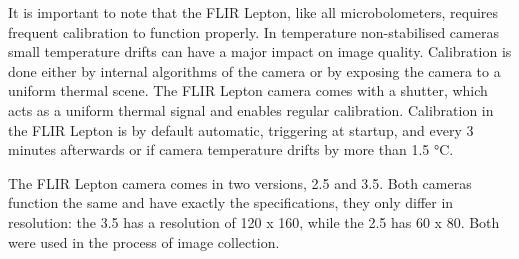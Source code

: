 It is important to note that the FLIR Lepton, like all microbolometers, requires frequent calibration to function properly.
In temperature non-stabilised cameras small temperature drifts can have a major impact on image quality\cite{thermal_book}.
Calibration is done either by internal algorithms of the camera or by exposing the camera to a uniform thermal scene.
The FLIR Lepton camera comes with a shutter, which acts as a uniform thermal signal and enables regular calibration.
Calibration in the FLIR Lepton is by default automatic, triggering at startup, and every 3 minutes afterwards or if camera temperature drifts by more than 1.5 \si{\celsius}.

The FLIR Lepton camera comes in two versions, 2.5 and 3.5.
Both cameras function the same and have exactly the specifications, they only differ in resolution: the 3.5 has a resolution of 120 x 160, while the 2.5 has 60 x 80.
Both were used in the process of image collection.
